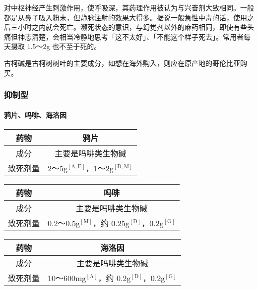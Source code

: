 \documentclass[UTF8]{ctexart}
\begin{document}
对中枢神经产生刺激作用，使呼吸深，其药理作用被认为与兴奋剂大致相同。一般都是从鼻子吸入粉末，但静脉注射的效果大得多。据说一般急性中毒的话，使用之后三小时之内就会死亡。濒死状态的意识，与幻觉剂以外的麻药相同，即使有些头痛但神志清楚，会相当冷静地思考「这不太好」、「不能这个样子死去」。常用者每天摄取 1.5～2g 也不至于死的。

古柯碱是古柯树树叶的主要成分，如想在海外购入，则应在原产地的哥伦比亚购买。

\subsubsection*{抑制型}

\paragraph*{鸦片、吗啡、海洛因}

\begin{table}[htbp]
\begin{center}
\begin{tabular}{cc}

\toprule
药物 & 鸦片 \\
\midrule
成分 & 主要是吗啡类生物碱 \\
致死剂量 & 2～5g$^\mathrm{[A,E]}$，1～2g$^\mathrm{[D,M]}$ \\
\bottomrule
\end{tabular}
\end{center}
\end{table}

\begin{table}[htbp]
\begin{center}
\begin{tabular}{cc}

\toprule
药物 & 吗啡 \\
\midrule
成分 & 主要是吗啡类生物碱 \\
致死剂量 & 0.2～0.5g$^\mathrm{[M]}$，约 0.25g$^\mathrm{[D]}$，0.2g$^\mathrm{[G]}$ \\
\bottomrule
\end{tabular}
\end{center}
\end{table}

\begin{table}[htbp]
\begin{center}
\begin{tabular}{cc}

\toprule
药物 & 海洛因 \\
\midrule
成分 & 主要是吗啡类生物碱 \\
致死剂量 & 10～600mg$^\mathrm{[A]}$，约 0.2g$^\mathrm{[D]}$，0.2g$^\mathrm{[G]}$ \\
\bottomrule
\end{tabular}
\end{center}
\end{table}
\end{document}

